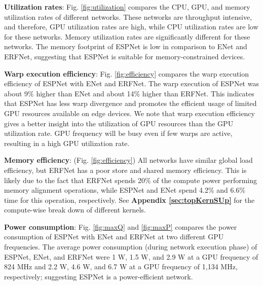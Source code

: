 \documentclass[runningheads]{llncs}
\def\Fig{Fig. }
\begin{document}
\noindent \textbf{Utilization rates}: \Fig \ref{fig:utilization} compares the CPU, GPU, and memory utilization rates of different networks. These networks are throughput intensive, and therefore, GPU utilization rates are high, while CPU utilization rates are low for these networks. Memory utilization rates are significantly different for these networks. The memory footprint of ESPNet is low in comparison to ENet and ERFNet, suggesting that ESPNet is suitable for memory-constrained devices.

\noindent \textbf{Warp execution efficiency}: \Fig \ref{fig:efficiency} compares the warp execution efficiency of ESPNet with ENet and ERFNet. The warp execution of ESPNet was about 9\% higher than ENet and about 14\% higher than ERFNet. This indicates that ESPNet has less warp divergence and promotes the efficient usage of limited GPU resources available on edge devices.  We note that warp execution efficiency gives a better insight into the utilization of GPU resources than the GPU utilization rate. GPU frequency will be busy even if few warps are active, resulting in a high GPU utilization rate.

\noindent \textbf{Memory efficiency}: (\Fig \ref{fig:efficiency}) All networks have similar global load efficiency, but ERFNet has a poor store and shared memory efficiency. This is likely due to the fact that ERFNet spends 20\% of the compute power performing memory alignment operations, while ESPNet and ENet spend 4.2\% and 6.6\% time for this operation, respectively. See \textbf{Appendix \ref{sec:topKernSUp}} for the compute-wise break down of different kernels.

\noindent \textbf{Power consumption}: \Fig \ref{fig:maxQ} and \ref{fig:maxP} compares the power consumption of ESPNet with ENet and ERFNet at two different GPU frequencies. The average power consumption (during network execution phase) of ESPNet, ENet, and ERFNet were 1 W, 1.5 W, and 2.9 W at a GPU frequency of 824 MHz and 2.2 W, 4.6 W, and 6.7 W at a GPU frequency of  1,134 MHz, respectively; suggesting ESPNet is a power-efficient network.
\end{document}
